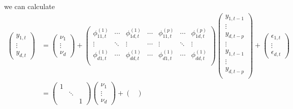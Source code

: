 \documentclass[fleqn]{article}
\begin{document}
we can calculate
\begin{align*}
    \begin{pmatrix}
        y_{1, t} \\
        \vdots \\
        y_{d, t}
    \end{pmatrix}
    & =
    \begin{pmatrix}
        \nu_1 \\
        \vdots \\
        \nu_d
    \end{pmatrix}
    +
    \begin{pmatrix}
        \phi^{(1)}_{11, t} & \cdots & \phi^{(1)}_{1d, t}
        & \cdots &
        \phi^{(p)}_{11, t} & \cdots & \phi^{(p)}_{1d, t} \\
        \vdots & \ddots & \vdots
        & \cdots &
        \vdots & \ddots & \vdots \\
        \phi^{(1)}_{d1, t} & \cdots & \phi^{(1)}_{dd, t}
        & \cdots &
        \phi^{(1)}_{d1, t} & \cdots & \phi^{(1)}_{dd, t} \\
    \end{pmatrix}
    \begin{pmatrix}
        y_{1, t-1} \\
        \vdots \\
        y_{d, t-p} \\
        \vdots \\
        y_{1, t-1} \\
        \vdots \\
        y_{d, t-p} \\
    \end{pmatrix}
    +
    \begin{pmatrix}
        \epsilon_{1, t} \\
        \vdots \\
        \epsilon_{d, t}
    \end{pmatrix} \\
    &= \begin{pmatrix}
        1 & & \\
        & \ddots & \\
        & & 1
    \end{pmatrix}
    \begin{pmatrix}
        \nu_1 \\
        \vdots \\
        \nu_d
    \end{pmatrix}
    + \begin{pmatrix}

\end{pmatrix}
\end{align*}
\end{document}
